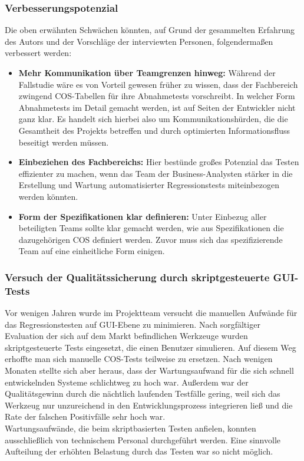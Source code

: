 \subsubsection{Verbesserungspotenzial}
\label{sec:massnahmen}
Die oben erwähnten Schwächen könnten, auf Grund der gesammelten Erfahrung des Autors und der Vorschläge der interviewten Personen, folgendermaßen verbessert werden:

\begin{itemize}
\item \textbf{Mehr Kommunikation über Teamgrenzen hinweg:} Während der Fallstudie wäre es von Vorteil gewesen früher zu wissen, dass der Fachbereich zwingend \Gls{COS}-Tabellen für ihre Abnahmetests vorschreibt. In welcher Form Abnahmetests im Detail gemacht werden, ist auf Seiten der Entwickler nicht ganz klar. Es handelt sich hierbei also um Kommunikationshürden, die die Gesamtheit des Projekts betreffen und durch optimierten Informationsfluss beseitigt werden müssen.
\item \textbf{Einbeziehen des Fachbereichs:} Hier bestünde großes Potenzial das Testen effizienter zu machen, wenn das Team der Business-Analysten stärker in die Erstellung und Wartung automatisierter Regressionstests miteinbezogen werden könnten.
\item \textbf{Form der Spezifikationen klar definieren:} Unter Einbezug aller beteiligten Teams sollte klar gemacht werden, wie aus Spezifikationen die dazugehörigen \Gls{COS} definiert werden. Zuvor muss sich das spezifizierende Team auf eine einheitliche Form einigen.
\end{itemize}


\subsubsection{Versuch der Qualitätssicherung durch skriptgesteuerte GUI-Tests}
\label{sec:versuch_script}
Vor wenigen Jahren wurde im Projektteam versucht die manuellen Aufwände für das Regressionstesten auf GUI-Ebene zu minimieren. Nach sorgfältiger Evaluation der sich auf dem Markt befindlichen Werkzeuge wurden skriptgesteuerte Tests eingesetzt, die einen Benutzer simulieren. Auf diesem Weg erhoffte man sich manuelle \Gls{COS}-Tests teilweise zu ersetzen. Nach wenigen Monaten stellte sich aber heraus, dass der Wartungsaufwand für die sich schnell entwickelnden Systeme schlichtweg zu hoch war. Außerdem war der Qualitätsgewinn durch die nächtlich laufenden Testfälle gering, weil sich das Werkzeug nur unzureichend in den Entwicklungsprozess integrieren ließ und die Rate der falschen Positivfälle sehr hoch war.\\
Wartungsaufwände, die beim skriptbasierten Testen anfielen, konnten ausschließlich von technischem Personal durchgeführt werden. Eine sinnvolle Aufteilung der erhöhten Belastung durch das Testen war so nicht möglich.

